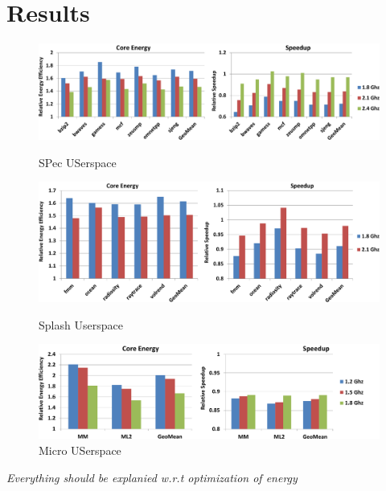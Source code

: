 \section{Results}\label{sec:results}

\begin{figure}[htp]
  \begin{center}
\includegraphics[width=\linewidth]{figs/user-spec-crop.pdf}
  \end{center}
  \vspace{-0.1in}
  \caption{SPec USerspace}
  \label{fig:user-spec}

\includegraphics[width=\linewidth]{figs/user-splash-crop.pdf}
  \vspace{-0.1in}
  \caption{Splash Userspace}
  \label{fig:user-splash}

\includegraphics[width=\linewidth]{figs/user-micro-crop.pdf}
  \vspace{-0.1in}
  \caption{Micro USerspace}
  \label{fig:user-micro}
\end{figure}



\emph{Everything should be explanied w.r.t optimization of energy}
